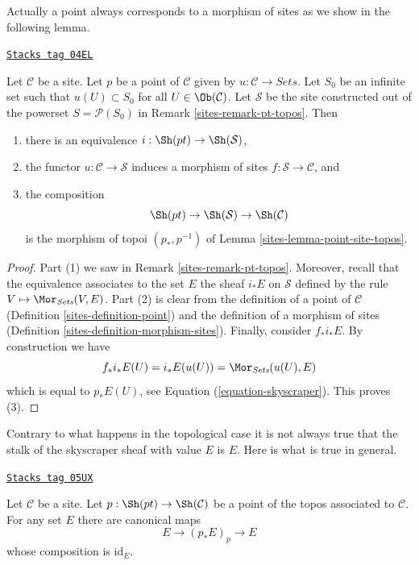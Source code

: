 Actually a point always corresponds to a morphism of sites as we
show in the following lemma.

\begin{lemma}
\label{sites-lemma-site-point-morphism}
\href{https://stacks.math.columbia.edu/tag/04EL}{\texttt{Stacks tag 04EL}}

Let $\mathcal{C}$ be a site. Let $p$ be a point of $\mathcal{C}$ given by
$u : \mathcal{C} \to \textit{Sets}$. Let $S_0$ be an infinite set such that
$u(U) \subset S_0$ for all $U \in \Ob(\mathcal{C})$. Let $\mathcal{S}$
be the site constructed out of the powerset $S = \mathcal{P}(S_0)$ in
Remark \ref{sites-remark-pt-topos}.
Then
\begin{enumerate}
\item there is an equivalence
$i : \Sh(pt) \to \Sh(\mathcal{S})$,
\item the functor $u : \mathcal{C} \to \mathcal{S}$ induces a morphism of
sites $f : \mathcal{S} \to \mathcal{C}$, and
\item the composition
$$
\Sh(pt) \to
\Sh(\mathcal{S}) \to
\Sh(\mathcal{C})
$$
is the morphism of topoi $(p_*, p^{-1})$ of
Lemma \ref{sites-lemma-point-site-topos}.
\end{enumerate}
\end{lemma}

\begin{proof}

Part (1) we saw in
Remark \ref{sites-remark-pt-topos}.
Moreover, recall that the equivalence associates to the set $E$
the sheaf $i_*E$ on $\mathcal{S}$ defined by the rule
$V \mapsto \Mor_{\textit{Sets}}(V, E)$.
Part (2) is clear from the definition of a point of $\mathcal{C}$
(Definition \ref{sites-definition-point})
and the definition of a morphism of sites
(Definition \ref{sites-definition-morphism-sites}).
Finally, consider $f_*i_*E$. By construction we have
$$
f_*i_*E(U) = i_*E(u(U)) = \Mor_{\textit{Sets}}(u(U), E)
$$
which is equal to $p_*E(U)$, see
Equation (\ref{equation-skyscraper}).
This proves (3).
\end{proof}

Contrary to what happens in the topological case it is not always
true that the stalk of the skyscraper sheaf with value $E$ is $E$.
Here is what is true in general.

\begin{lemma}
\label{sites-lemma-stalk-skyscraper}
\href{https://stacks.math.columbia.edu/tag/05UX}{\texttt{Stacks tag 05UX}}

Let $\mathcal{C}$ be a site. Let
$p : \Sh(pt) \to \Sh(\mathcal{C})$ be a point of
the topos associated to $\mathcal{C}$.
For any set $E$ there are canonical maps
$$
E \longrightarrow (p_*E)_p \longrightarrow E
$$
whose composition is $\text{id}_E$.
\end{lemma}

